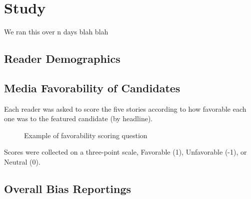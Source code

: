 \chapter{Study}
We ran this over n days blah blah

\section{Reader Demographics}

\section{Media Favorability of Candidates}
Each reader was asked to score the five stories according to how favorable each one was to the featured candidate (by headline). 

\begin{figure}[h!] 
\centering
  \caption{Example of favorability scoring question}
\end{figure}
 
Scores were collected on a three-point scale, Favorable (1), Unfavorable (-1), or Neutral (0).
\section{Overall Bias Reportings}


%
 